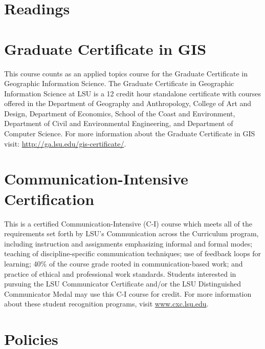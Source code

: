 \documentclass[11pt,article,oneside]{memoir}
\begin{document}
\clearpage

\section{Readings}
\vspace*{0.5cm}
\nocite{*}
\setlength{}
\printbibliography[heading=none]

\section{Graduate Certificate in GIS}
This course counts as an applied topics course for the 
Graduate Certificate in Geographic Information Science.
The Graduate Certificate in Geographic Information Science at LSU 
is a 12 credit hour standalone certificate
with courses offered 
in the Department of Geography and Anthropology, 
College of Art and Design, 
Department of Economics, 
School of the Coast and Environment, 
Department of Civil and Environmental Engineering, 
and Department of Computer Science. 
For more information about the Graduate Certificate in GIS visit: 
\url{http://ga.lsu.edu/gis-certificate/}.


\section{Communication-Intensive Certification}
This is a certified Communication-Intensive (C-I) course which meets all of the requirements set forth by LSU's Communication across the Curriculum program, including
instruction and assignments emphasizing informal and formal modes;
teaching of discipline-specific communication techniques;
use of feedback loops for learning;
40\% of the course grade rooted in communication-based work; 
and practice of ethical and professional work standards.
Students interested in pursuing the LSU Communicator Certificate and/or the LSU Distinguished Communicator Medal may use this C-I course for credit. For more information about these student recognition programs, visit \url{www.cxc.lsu.edu}.\\

\section{Policies}
\end{document}
